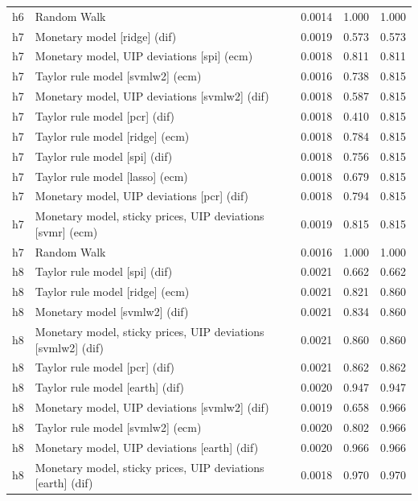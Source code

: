 \begin{ThreePartTable}
\begin{longtable}[t]{cp{5.5cm}ccc}
h6 & \raggedright Random Walk & 0.0014 & 1.000 & 1.000\\
\addlinespace
h7 & \raggedright Monetary model [ridge] (dif) & 0.0019 & 0.573 & 0.573\\
h7 & \raggedright Monetary model, UIP deviations [spi] (ecm) & 0.0018 & 0.811 & 0.811\\
h7 & \raggedright Taylor rule model [svmlw2] (ecm) & 0.0016 & 0.738 & 0.815\\
h7 & \raggedright Monetary model, UIP deviations [svmlw2] (dif) & 0.0018 & 0.587 & 0.815\\
h7 & \raggedright Taylor rule model [pcr] (dif) & 0.0018 & 0.410 & 0.815\\
h7 & \raggedright Taylor rule model [ridge] (ecm) & 0.0018 & 0.784 & 0.815\\
h7 & \raggedright Taylor rule model [spi] (dif) & 0.0018 & 0.756 & 0.815\\
h7 & \raggedright Taylor rule model [lasso] (ecm) & 0.0018 & 0.679 & 0.815\\
h7 & \raggedright Monetary model, UIP deviations [pcr] (dif) & 0.0018 & 0.794 & 0.815\\
h7 & \raggedright Monetary model, sticky prices, UIP deviations [svmr] (ecm) & 0.0019 & 0.815 & 0.815\\
h7 & \raggedright Random Walk & 0.0016 & 1.000 & 1.000\\
\addlinespace
h8 & \raggedright Taylor rule model [spi] (dif) & 0.0021 & 0.662 & 0.662\\
h8 & \raggedright Taylor rule model [ridge] (ecm) & 0.0021 & 0.821 & 0.860\\
h8 & \raggedright Monetary model [svmlw2] (dif) & 0.0021 & 0.834 & 0.860\\
h8 & \raggedright Monetary model, sticky prices, UIP deviations [svmlw2] (dif) & 0.0021 & 0.860 & 0.860\\
h8 & \raggedright Taylor rule model [pcr] (dif) & 0.0021 & 0.862 & 0.862\\
h8 & \raggedright Taylor rule model [earth] (dif) & 0.0020 & 0.947 & 0.947\\
h8 & \raggedright Monetary model, UIP deviations [svmlw2] (dif) & 0.0019 & 0.658 & 0.966\\
h8 & \raggedright Taylor rule model [svmlw2] (ecm) & 0.0020 & 0.802 & 0.966\\
h8 & \raggedright Monetary model, UIP deviations [earth] (dif) & 0.0020 & 0.966 & 0.966\\
h8 & \raggedright Monetary model, sticky prices, UIP deviations [earth] (dif) & 0.0018 & 0.970 & 0.970\\

\end{longtable}
\end{ThreePartTable}
